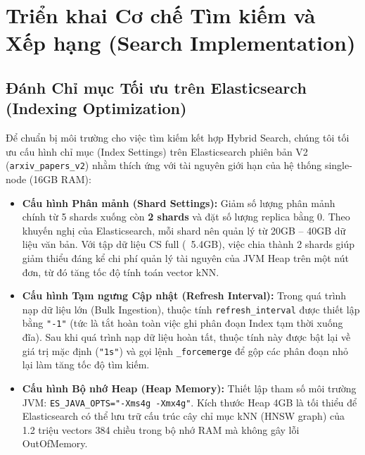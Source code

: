 \chapter{Triển khai Cơ chế Tìm kiếm và Xếp hạng (Search Implementation)}
\label{ch:search-implementation}

\section{Đánh Chỉ mục Tối ưu trên Elasticsearch (Indexing Optimization)}
Để chuẩn bị môi trường cho việc tìm kiếm kết hợp Hybrid Search, chúng tôi tối ưu cấu hình chỉ mục (Index Settings) trên Elasticsearch phiên bản V2 (\texttt{arxiv\_papers\_v2}) nhằm thích ứng với tài nguyên giới hạn của hệ thống single-node (16GB RAM):
\begin{itemize}
    \item \textbf{Cấu hình Phân mảnh (Shard Settings):} Giảm số lượng phân mảnh chính từ 5 shards xuống còn \textbf{2 shards} và đặt số lượng replica bằng 0. Theo khuyến nghị của Elasticsearch, mỗi shard nên quản lý từ 20GB -- 40GB dữ liệu văn bản. Với tập dữ liệu CS full (~5.4GB), việc chia thành 2 shards giúp giảm thiểu đáng kể chi phí quản lý tài nguyên của JVM Heap trên một nút đơn, từ đó tăng tốc độ tính toán vector kNN.
    \item \textbf{Cấu hình Tạm ngưng Cập nhật (Refresh Interval):} Trong quá trình nạp dữ liệu lớn (Bulk Ingestion), thuộc tính \texttt{refresh\_interval} được thiết lập bằng \texttt{"-1"} (tức là tắt hoàn toàn việc ghi phân đoạn Index tạm thời xuống đĩa). Sau khi quá trình nạp dữ liệu hoàn tất, thuộc tính này được bật lại về giá trị mặc định (\texttt{"1s"}) và gọi lệnh \texttt{\_forcemerge} để gộp các phân đoạn nhỏ lại làm tăng tốc độ tìm kiếm.
    \item \textbf{Cấu hình Bộ nhớ Heap (Heap Memory):} Thiết lập tham số môi trường JVM: \texttt{ES\_JAVA\_OPTS="-Xms4g -Xmx4g"}. Kích thước Heap 4GB là tối thiểu để Elasticsearch có thể lưu trữ cấu trúc cây chỉ mục kNN (HNSW graph) của 1.2 triệu vectors 384 chiều trong bộ nhớ RAM mà không gây lỗi OutOfMemory.
\end{itemize}

